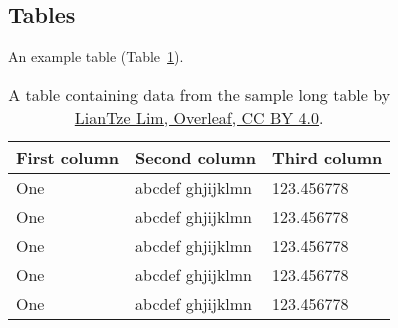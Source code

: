 \documentclass[aspectratio=169,xcolor={svgnames}]{beamer}
\begin{document}
\subsection{Tables}
\begin{frame}{\insertsubsectionhead}
  An example table (Table~\ref{tab:norm}).

  \begin{table}
    \caption{A table containing data from the sample long table by
      \href{
        https://www.overleaf.com/latex/examples/a-longtable-example/xxwzfxkxxjmc
      }{LianTze Lim, Overleaf, CC BY 4.0}. \label{tab:norm}
    }
    \footnotesize
    \begin{center}
      \begin{tabular}{lll}
        \toprule
        \textbf{First column} & \textbf{Second column} &
        \textbf{Third column} \\
        \midrule
        One & abcdef ghjijklmn & 123.456778 \\
        One & abcdef ghjijklmn & 123.456778 \\
        One & abcdef ghjijklmn & 123.456778 \\
        One & abcdef ghjijklmn & 123.456778 \\
        One & abcdef ghjijklmn & 123.456778 \\
        \bottomrule
      \end{tabular}
    \end{center}
  \end{table}
\end{frame}

\end{document}
